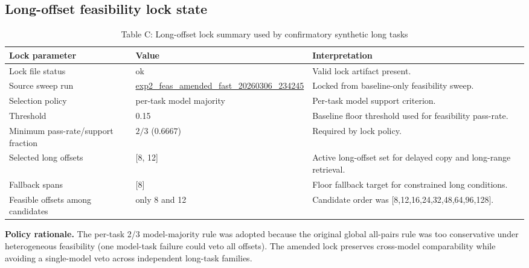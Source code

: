 \documentclass[11pt]{article}
\begin{document}
\subsection*{Long-offset feasibility lock state}
\begin{table}[ht]
\centering
\caption{Table C: Long-offset lock summary used by confirmatory synthetic long tasks}
\begin{tabularx}{\textwidth}{L{0.35\textwidth}L{0.22\textwidth}Y}
\toprule
\textbf{Lock parameter} & \textbf{Value} & \textbf{Interpretation} \\
\midrule
Lock file status & ok & Valid lock artifact present. \\
Source sweep run & \url{exp2_feas_amended_fast_20260306_234245} & Locked from baseline-only feasibility sweep. \\
Selection policy & per-task model majority & Per-task model support criterion. \\
Threshold & 0.15 & Baseline floor threshold used for feasibility pass-rate. \\
Minimum pass-rate/support fraction & $2/3$ ($0.6667$) & Required by lock policy. \\
Selected long offsets & [8, 12] & Active long-offset set for delayed copy and long-range retrieval. \\
Fallback spans & [8] & Floor fallback target for constrained long conditions. \\
Feasible offsets among candidates & only 8 and 12 & Candidate order was [8,12,16,24,32,48,64,96,128]. \\
\bottomrule
\end{tabularx}
\end{table}

\noindent
\textbf{Policy rationale.} The per-task 2/3 model-majority rule was adopted because the original global all-pairs rule was too conservative under heterogeneous feasibility (one model-task failure could veto all offsets). The amended lock preserves cross-model comparability while avoiding a single-model veto across independent long-task families.
\end{document}
